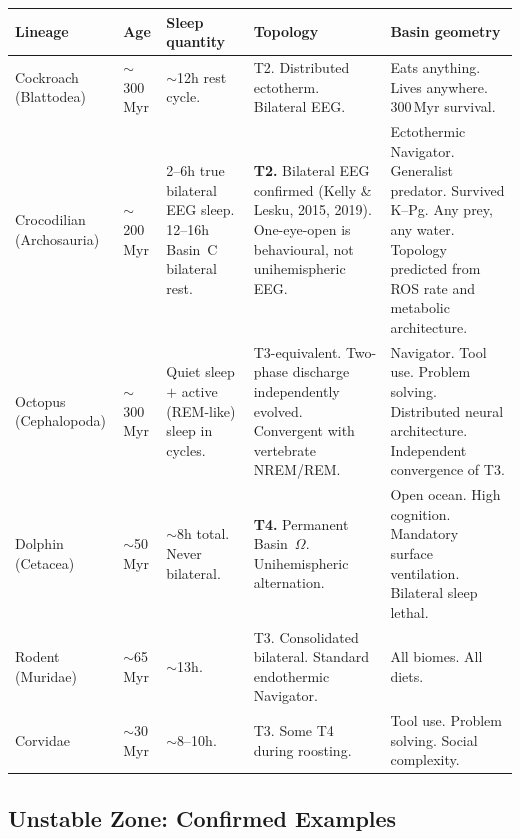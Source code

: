\documentclass[10pt, a4paper]{article}
\begin{document}
\begin{center}
\small
\begin{longtable}{p{2.0cm}p{1.2cm}p{2.5cm}
                  p{2.5cm}p{3.2cm}}
\toprule
\textbf{Lineage} &
\textbf{Age} &
\textbf{Sleep quantity} &
\textbf{Topology} &
\textbf{Basin geometry}\\
\midrule
Cockroach
(Blattodea) &
$\sim$300\,Myr &
$\sim$12h rest
cycle. &
T2. Distributed
ectotherm.
Bilateral EEG. &
Eats anything.
Lives anywhere.
300\,Myr survival.\\[0.3em]
Crocodilian
(Archosauria) &
$\sim$200\,Myr &
2--6h true bilateral
EEG sleep.
12--16h Basin~C
bilateral rest. &
\textbf{T2.}
Bilateral EEG
confirmed
(Kelly \& Lesku,
2015, 2019).
One-eye-open is
behavioural, not
unihemispheric
EEG. &
Ectothermic
Navigator.
Generalist predator.
Survived K--Pg.
Any prey, any water.
Topology predicted
from ROS rate and
metabolic architecture.\\[0.3em]
Octopus
(Cephalopoda) &
$\sim$300\,Myr &
Quiet sleep $+$
active (REM-like)
sleep in cycles. &
T3-equivalent.
Two-phase discharge
independently
evolved. Convergent
with vertebrate
NREM/REM. &
Navigator. Tool use.
Problem solving.
Distributed neural
architecture.
Independent
convergence of T3.\\[0.3em]
Dolphin
(Cetacea) &
$\sim$50\,Myr &
$\sim$8h total.
Never bilateral. &
\textbf{T4.}
Permanent
Basin~$\Omega$.
Unihemispheric
alternation. &
Open ocean.
High cognition.
Mandatory surface
ventilation.
Bilateral sleep
lethal.\\[0.3em]
Rodent
(Muridae) &
$\sim$65\,Myr &
$\sim$13h. &
T3. Consolidated
bilateral.
Standard
endothermic
Navigator. &
All biomes.
All diets.\\[0.3em]
Corvidae &
$\sim$30\,Myr &
$\sim$8--10h. &
T3. Some T4
during roosting. &
Tool use.
Problem solving.
Social complexity.\\
\bottomrule
\end{longtable}
\end{center}

\subsection{Unstable Zone: Confirmed Examples}
\end{document}
